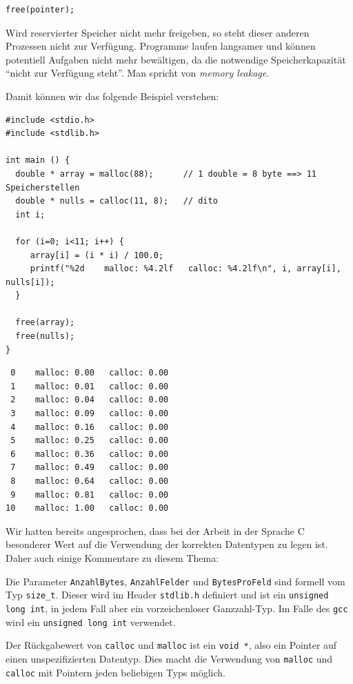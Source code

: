 \begin{codebox}
\begin{verbatim}
free(pointer);
\end{verbatim}
\end{codebox}

Wird reservierter Speicher nicht mehr freigeben, so steht dieser anderen Prozessen nicht zur Verfügung. Programme laufen langsamer und können potentiell Aufgaben nicht mehr bewältigen, da die notwendige Speicherkapazität \enquote{nicht zur Verfügung steht}. Man spricht von \emph{memory leakage}.

Damit können wir das folgende Beispiel verstehen:

\begin{codebox}
\begin{verbatim}
#include <stdio.h>
#include <stdlib.h>

int main () {
  double * array = malloc(88);      // 1 double = 8 byte ==> 11 Speicherstellen
  double * nulls = calloc(11, 8);   // dito
  int i;
  
  for (i=0; i<11; i++) {
     array[i] = (i * i) / 100.0;
     printf("%2d    malloc: %4.2lf   calloc: %4.2lf\n", i, array[i], nulls[i]);
  }
  
  free(array);
  free(nulls);
}
\end{verbatim}
\end{codebox}

\begin{cmdbox}
\begin{verbatim}
 0    malloc: 0.00   calloc: 0.00
 1    malloc: 0.01   calloc: 0.00
 2    malloc: 0.04   calloc: 0.00
 3    malloc: 0.09   calloc: 0.00
 4    malloc: 0.16   calloc: 0.00
 5    malloc: 0.25   calloc: 0.00
 6    malloc: 0.36   calloc: 0.00
 7    malloc: 0.49   calloc: 0.00
 8    malloc: 0.64   calloc: 0.00
 9    malloc: 0.81   calloc: 0.00
10    malloc: 1.00   calloc: 0.00
\end{verbatim}
\end{cmdbox}

\begin{hintbox}
Wir hatten bereits angesprochen, dass bei der Arbeit in der Sprache C besonderer Wert auf die Verwendung der korrekten Datentypen zu legen ist. Daher auch einige Kommentare zu diesem Thema:

Die Parameter \texttt{AnzahlBytes}, \texttt{AnzahlFelder} und \texttt{BytesProFeld} sind formell vom Typ \texttt{size\_t}. Dieser wird im Header \texttt{stdlib.h} definiert und ist \idR ein \texttt{unsigned long int}, in jedem Fall aber ein vorzeichenloser Ganzzahl-Typ. Im Falle des \texttt{gcc} wird ein \texttt{unsigned long int} verwendet.

Der Rückgabewert von \texttt{calloc} und \texttt{malloc} ist ein \texttt{void *}, also ein Pointer auf einen unspezifizierten Datentyp. Dies macht die Verwendung von \texttt{malloc} und \texttt{calloc} mit Pointern jeden beliebigen Typs möglich.
\end{hintbox}

